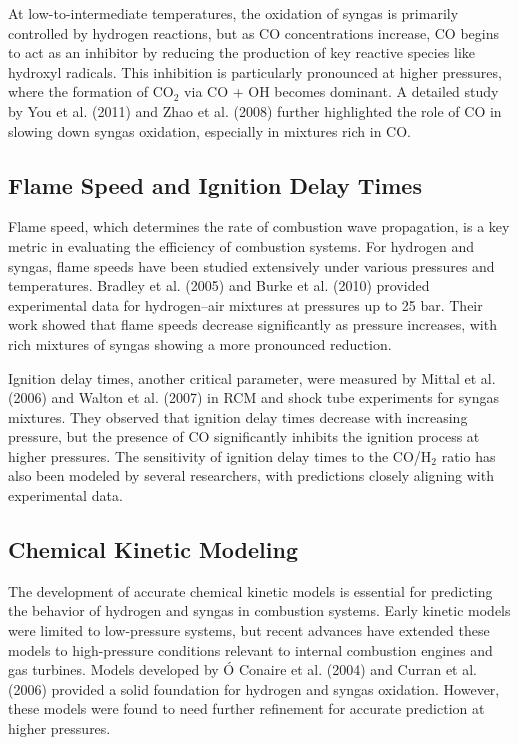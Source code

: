 \documentclass[12pt]{report}
\begin{document}
At low-to-intermediate temperatures, the oxidation of syngas is primarily controlled by hydrogen reactions, but as CO concentrations increase, CO begins to act as an inhibitor by reducing the production of key reactive species like hydroxyl radicals. This inhibition is particularly pronounced at higher pressures, where the formation of CO$_2$ via CO + OH becomes dominant. A detailed study by You et al. (2011) and Zhao et al. (2008) further highlighted the role of CO in slowing down syngas oxidation, especially in mixtures rich in CO.

\subsection{Flame Speed and Ignition Delay Times}
Flame speed, which determines the rate of combustion wave propagation, is a key metric in evaluating the efficiency of combustion systems. For hydrogen and syngas, flame speeds have been studied extensively under various pressures and temperatures. Bradley et al. (2005) and Burke et al. (2010) provided experimental data for hydrogen–air mixtures at pressures up to 25 bar. Their work showed that flame speeds decrease significantly as pressure increases, with rich mixtures of syngas showing a more pronounced reduction.

Ignition delay times, another critical parameter, were measured by Mittal et al. (2006) and Walton et al. (2007) in RCM and shock tube experiments for syngas mixtures. They observed that ignition delay times decrease with increasing pressure, but the presence of CO significantly inhibits the ignition process at higher pressures. The sensitivity of ignition delay times to the CO/H$_2$ ratio has also been modeled by several researchers, with predictions closely aligning with experimental data.

\subsection{Chemical Kinetic Modeling}
The development of accurate chemical kinetic models is essential for predicting the behavior of hydrogen and syngas in combustion systems. Early kinetic models were limited to low-pressure systems, but recent advances have extended these models to high-pressure conditions relevant to internal combustion engines and gas turbines. Models developed by Ó Conaire et al. (2004) and Curran et al. (2006) provided a solid foundation for hydrogen and syngas oxidation. However, these models were found to need further refinement for accurate prediction at higher pressures.
\end{document}
